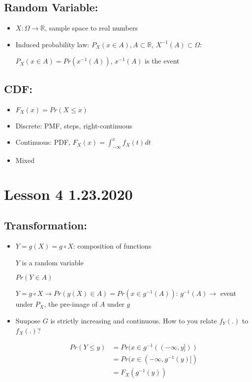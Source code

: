 \documentclass[11pt,letterpaper,titlepage]{article}
\begin{document}
\subsection{Random Variable:}

\begin{itemize}
    \item $X: \Omega \rightarrow \mathbb{R}$, sample space to real numbers
    
    \item Induced probability law: $P_X(x \in A), A \subset \mathbb{R}$, $X^{-1} (A) \subset \Omega$:
    
    $P_X(x \in A) = Pr(x^{-1} (A))$, $x^{-1} (A)$ is the event
\end{itemize}

\subsection{CDF:}

\begin{itemize}
    \item $F_X (x) = Pr(X \leq x)$
    
    \item Discrete: PMF, steps, right-continuous
    
    \item Continuous: PDF, $F_X (x) = \int_{-\infty}^{x} f_X(t)dt$
    
    \item Mixed
\end{itemize}

\newpage

\section{Lesson 4 1.23.2020}

\subsection{Transformation:}

\begin{itemize}
    \item $Y = g(X) = g \circ X$: composition of functions
    
    $Y$ is a random variable
    
    $Pr(Y \in A)$
    
    $Y = g \circ X \rightarrow Pr(g(X) \in A) = Pr(x \in g^{-1}(A))$: $g^{-1}(A) \rightarrow$ event under $P_X$, the pre-image of $A$ under $g$
    
    \item Suupose $G$ is strictly increasing and continuous. How to you relate $f_Y(.)$ to $f_X(.)$?
    
    \begin{equation*}
        \begin{aligned}
            Pr(Y \leq y) &= Pr(x \in g^{-1}((-\infty, y])) \\
            &= Pr(x \in (-\infty, g^{-1} (y)]) \\
            &= F_X(g^{-1} (y))
        \end{aligned}
    \end{equation*}
\end{itemize}
\end{document}
